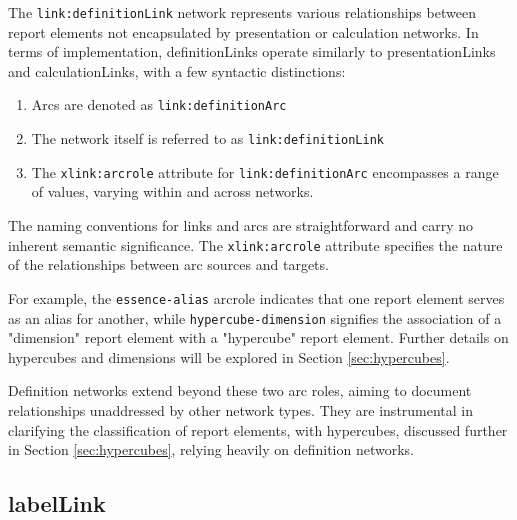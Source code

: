 The \texttt{link:definitionLink} network represents various relationships between report elements not encapsulated by presentation or calculation networks.  
In terms of implementation, definitionLinks operate similarly to presentationLinks and calculationLinks,  
with a few syntactic distinctions:

\begin{enumerate}  
    \item Arcs are denoted as \texttt{link:definitionArc}  
    \item The network itself is referred to as \texttt{link:definitionLink}  
    \item The \texttt{xlink:arcrole} attribute for \texttt{link:definitionArc} encompasses a range of values, varying within and across networks. 
\end{enumerate}  

The naming conventions for links and arcs are straightforward and carry no inherent semantic significance.  
The \texttt{xlink:arcrole} attribute specifies the nature of the relationships between arc sources and targets.  

For example, the \texttt{essence-alias} arcrole indicates that one report element serves as an alias for another,  
while \texttt{hypercube-dimension} signifies the association of a "dimension" report element with a "hypercube" report element.  
Further details on hypercubes and dimensions will be explored in Section \ref{sec:hypercubes}.  

Definition networks extend beyond these two arc roles, aiming to document relationships unaddressed by other network types.  
They are instrumental in clarifying the classification of report elements,  
with hypercubes, discussed further in Section \ref{sec:hypercubes}, relying heavily on definition networks.

\subsection{labelLink}
\label{sec:labelLink}



